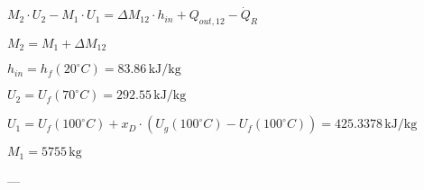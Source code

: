 \( M_2 \cdot U_2 - M_1 \cdot U_1 = \Delta M_{12} \cdot h_{in} + Q_{out,12} - \dot{Q}_{R} \)  

\( M_2 = M_1 + \Delta M_{12} \)  

\( h_{in} = h_f(20^\circ C) = 83.86 \, \text{kJ/kg} \)  

\( U_2 = U_f(70^\circ C) = 292.55 \, \text{kJ/kg} \)  

\( U_1 = U_f(100^\circ C) + x_D \cdot (U_g(100^\circ C) - U_f(100^\circ C)) = 425.3378 \, \text{kJ/kg} \)  

\( M_1 = 5755 \, \text{kg} \)  

---
